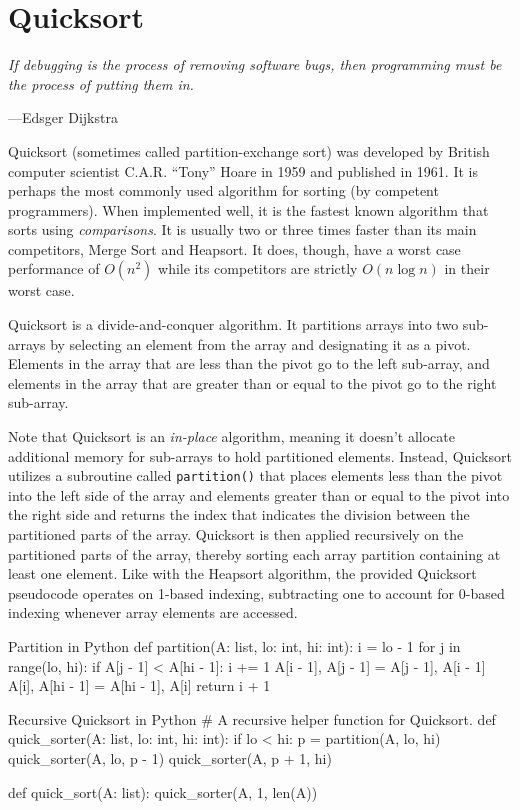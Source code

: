\section{Quicksort}

\epigraph{\emph{If debugging is the process of removing software bugs,
then programming must be the process of putting them in.}}{---Edsger
Dijkstra}

\noindent
Quicksort (sometimes called partition-exchange sort) was developed by
British computer scientist C.A.R. ``Tony'' Hoare in 1959 and published
in 1961. It is perhaps the most commonly used algorithm for sorting (by
competent programmers).  When implemented well, it is the fastest known
algorithm that sorts using \emph{comparisons}. It is usually two or
three times faster than its main competitors, Merge Sort and Heapsort.
It does, though, have a worst case performance of $O(n^2)$ while its
competitors are strictly $O(n \log n)$ in their worst case.

Quicksort is a divide-and-conquer algorithm. It partitions
arrays into two sub-arrays by selecting an element from the array and
designating it as a pivot. Elements in the array that are less than the
pivot go to the left sub-array, and elements in the array that are
greater than or equal to the pivot go to the right sub-array.

Note that Quicksort is an \emph{in-place} algorithm, meaning it doesn't
allocate additional memory for sub-arrays to hold partitioned elements.
Instead, Quicksort utilizes a subroutine called \texttt{partition()}
that places elements less than the pivot into the left side of the array
and elements greater than or equal to the pivot into the right side and
returns the index that indicates the division between the partitioned
parts of the array. Quicksort is then applied recursively on the
partitioned parts of the array, thereby sorting each array partition
containing at least one element. Like with the Heapsort algorithm, the
provided Quicksort pseudocode operates on 1-based indexing, subtracting
one to account for 0-based indexing whenever array elements are
accessed.

\begin{pylisting}{Partition in Python}
def partition(A: list, lo: int, hi: int):
    i = lo - 1
    for j in range(lo, hi):
        if A[j - 1] < A[hi - 1]:
            i += 1
            A[i - 1], A[j - 1] = A[j - 1], A[i - 1]
    A[i], A[hi - 1] = A[hi - 1], A[i]
    return i + 1
\end{pylisting}

\begin{pylisting}{Recursive Quicksort in Python}
# A recursive helper function for Quicksort.
def quick_sorter(A: list, lo: int, hi: int):
    if lo < hi:
        p = partition(A, lo, hi)
        quick_sorter(A, lo, p - 1)
        quick_sorter(A, p + 1, hi)

def quick_sort(A: list):
    quick_sorter(A, 1, len(A))
\end{pylisting}
